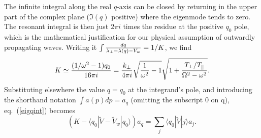 \documentclass{jpp}
\def\ket#1{|#1\rangle}
\def\bra#1{\langle#1}
\begin{document}
The infinite integral along the real
$q$-axis can be closed by returning in the upper part of the complex
plane ($\Im(q)$ positive) where the eigenmode tends
to zero. The resonant integral is then just $2\pi i$ times the residue
at the positive $q_0$ pole, which is the mathematical
  justification for our physical assumption of outwardly
  propagating waves. Writing it
$\int {dq\over \lambda_\perp-\lambda(q)-V_w}=1/K$,  we find
\begin{equation}
  \label{Kdef}
  K\simeq{(1/\omega^2-1)q_0\over16\pi i}
  ={k_\perp\over4\pi i}\sqrt{{1\over\omega^2}-1}
\sqrt{1+{T_\perp/T_\parallel\over\Omega^2-\omega^2}}.  
\end{equation}
Substituting elsewhere the value
$q=q_0$ at the integrand's pole, and introducing the shorthand
notation $\int a(p) dp=
a_q$ (omitting the subscript 0 on q), eq.\ (\ref{eigqint}) becomes
\begin{equation}
  \label{eigqint2}
  (K-\bra{q_0}|\tilde V-\tilde V_w\ket{q_0})a_q %
  = \sum_j\bra{q_0}|\tilde{V}\ket{j}a_j.
\end{equation}
\end{document}
